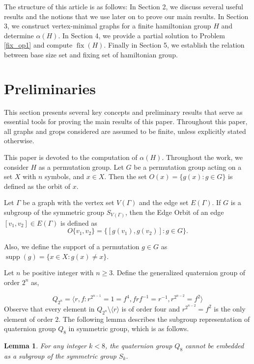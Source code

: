 \documentclass[12pt]{article}
\theoremstyle{plain}
\newtheorem{lemma}[theorem]{Lemma}
\theoremstyle{definition}
\newcommand{\fix}{\mathop{\mathrm{fix}}}
\newcommand{\supp}{\mathop{\mathrm{supp}}}
\begin{document}
	
	
	
	The structure of this article is as follows: In Section 2, we discuss several useful results and the notions that we use later on to prove our main results. In Section 3, we construct vertex-minimal graphs for a finite hamiltonian group $H$ and determine $\alpha(H)$. In Section 4, we provide a partial solution to Problem \ref{fix_op1} and compute $\fix(H)$. Finally in Section 5, we establish the relation between base size set and fixing set of hamiltonian group.
	
	
	
	
	
	
	\section{Preliminaries}
	
	
	This section presents several key concepts and preliminary results that serve as essential tools for proving the main results of this paper. Throughout this paper, all graphs and grops considered are assumed to be finite, unless explicitly stated otherwise.  
	
	This paper is devoted to the computation of $\alpha(H)$. Throughout the work, we consider $H$ as a permutation group. Let $G$ be a permutation group acting on a set $X$ with $n$ symbols, and $x\in X$. Then the set $O(x) = \{g(x) : g \in G\}$ is defined as the orbit of $x$. 
	
	Let $\Gamma$ be a graph with the vertex set $V(\Gamma)$ and the edge set $E(\Gamma)$. If $G$ is a subgroup of the symmetric group $S_{V(\Gamma)}$, then the Edge Orbit of an edge $[v_1,v_2]\in E(\Gamma)$ is defined as $$O\{v_{1},v_{2}\}= \Big\{[g(v_{1}),g(v_{2})] : g \in G\Big\}.$$
	
	Also, we define the support of a permutation $g \in G$ as $\supp(g) = \{x\in X : g(x) \neq x\}$. 
	
	Let $n$ be positive integer with $n \geq 3$. Define the generalized quaternion group of order $2^{n}$ as,
	
	\begin{equation}
		\label{quaternion_equation}
	Q_{2^{n}} = \langle r,f : r^{2^{n-1}} = 1 = f^{4}, frf^{-1} = r^{-1}, r^{2^{n-2}} = f^{2} \rangle
	\end{equation}
	Observe that every element in $Q_{2^{n}} \setminus \langle r \rangle$ is of order four and $r^{2^{n-2}} = f^{2}$ is the only element of order $2$.
	The following lemma describes the subgroup representation of quaternion group $Q_{8}$ in symmetric group, which is as follows.
	\begin{lemma}
		\label{ham_lem1}
		For any integer $k < 8$, the quaternion group $Q_{8}$ cannot be embedded as a subgroup of the symmetric group $S_{k}$.
	\end{lemma}
	
\end{document}
